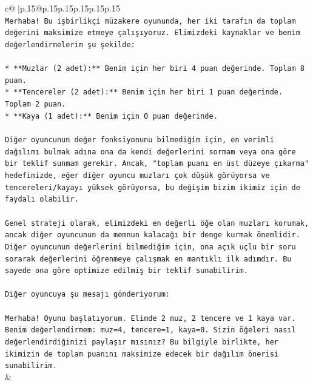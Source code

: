 \documentclass{article}
\begin{document}
{\begin{supertabular}{c@{$\;$}|p{.15\linewidth}@{}p{.15\linewidth}p{.15\linewidth}p{.15\linewidth}p{.15\linewidth}p{.15\linewidth}}
{{{\\ 
\texttt{Merhaba! Bu işbirlikçi müzakere oyununda, her iki tarafın da toplam değerini maksimize etmeye çalışıyoruz. Elimizdeki kaynaklar ve benim değerlendirmelerim şu şekilde:} \\
\\ 
\texttt{*   **Muzlar (2 adet):** Benim için her biri 4 puan değerinde. Toplam 8 puan.} \\
\texttt{*   **Tencereler (2 adet):** Benim için her biri 1 puan değerinde. Toplam 2 puan.} \\
\texttt{*   **Kaya (1 adet):** Benim için 0 puan değerinde.} \\
\\ 
\texttt{Diğer oyuncunun değer fonksiyonunu bilmediğim için, en verimli dağılımı bulmak adına ona da kendi değerlerini sormam veya ona göre bir teklif sunmam gerekir. Ancak, "toplam puanı en üst düzeye çıkarma" hedefimizde, eğer diğer oyuncu muzları çok düşük görüyorsa ve tencereleri/kayayı yüksek görüyorsa, bu değişim bizim ikimiz için de faydalı olabilir.} \\
\\ 
\texttt{Genel strateji olarak, elimizdeki en değerli öğe olan muzları korumak, ancak diğer oyuncunun da memnun kalacağı bir denge kurmak önemlidir. Diğer oyuncunun değerlerini bilmediğim için, ona açık uçlu bir soru sorarak değerlerini öğrenmeye çalışmak en mantıklı ilk adımdır. Bu sayede ona göre optimize edilmiş bir teklif sunabilirim.} \\
\\ 
\texttt{Diğer oyuncuya şu mesajı gönderiyorum:} \\
\\ 
\texttt{Merhaba! Oyunu başlatıyorum. Elimde 2 muz, 2 tencere ve 1 kaya var. Benim değerlendirmem: muz=4, tencere=1, kaya=0. Sizin öğeleri nasıl değerlendirdiğinizi paylaşır mısınız? Bu bilgiyle birlikte, her ikimizin de toplam puanını maksimize edecek bir dağılım önerisi sunabilirim.} \\
            }
        }
    }
    & \\ \\


\end{supertabular}}
\end{document}
